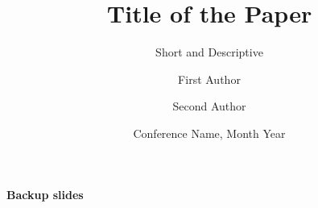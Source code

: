 \documentclass[aspectratio=169, 11pt]{beamer}
\title{Title of the Paper}
\subtitle{Short and Descriptive}
\author{First Author \and Second Author}
\institute{University \\ \texttt{first@uni.edu}}
\date{Conference Name, Month Year}
\begin{document}
\begin{frame}[plain]\titlepage\end{frame}







\appendix
\begin{frame}[plain]
  \begin{center}\Huge\bfseries Backup slides\end{center}
\end{frame}
% 
% 
\end{document}
